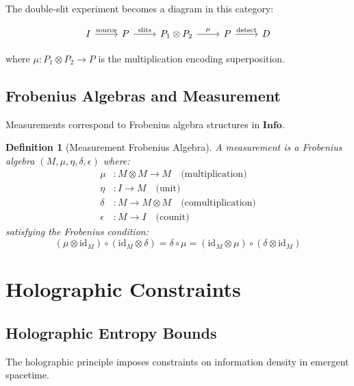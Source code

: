 \documentclass[12pt,a4paper]{article}
\newtheorem{definition}[theorem]{Definition}
\begin{document}
The double-slit experiment becomes a diagram in this category:

\begin{equation}
\begin{tikzcd}
I \arrow[r, "\text{source}"] & P \arrow[r, "\text{slits}"] & P_1 \otimes P_2 \arrow[r, "\mu"] & P \arrow[r, "\text{detect}"] & D
\end{tikzcd}
\end{equation}

where $\mu: P_1 \otimes P_2 \rightarrow P$ is the multiplication encoding superposition.

\subsection{Frobenius Algebras and Measurement}

Measurements correspond to Frobenius algebra structures in $\mathbf{Info}$.

\begin{definition}[Measurement Frobenius Algebra]
A measurement is a Frobenius algebra $(M, \mu, \eta, \delta, \epsilon)$ where:
\begin{align}
\mu &: M \otimes M \rightarrow M \quad \text{(multiplication)} \\
\eta &: I \rightarrow M \quad \text{(unit)} \\
\delta &: M \rightarrow M \otimes M \quad \text{(comultiplication)} \\
\epsilon &: M \rightarrow I \quad \text{(counit)}
\end{align}
satisfying the Frobenius condition:
\begin{equation}
(\mu \otimes \text{id}_M) \circ (\text{id}_M \otimes \delta) = \delta \circ \mu = (\text{id}_M \otimes \mu) \circ (\delta \otimes \text{id}_M)
\end{equation}
\end{definition}

\section{Holographic Constraints}

\subsection{Holographic Entropy Bounds}

The holographic principle imposes constraints on information density in emergent spacetime.
\end{document}
